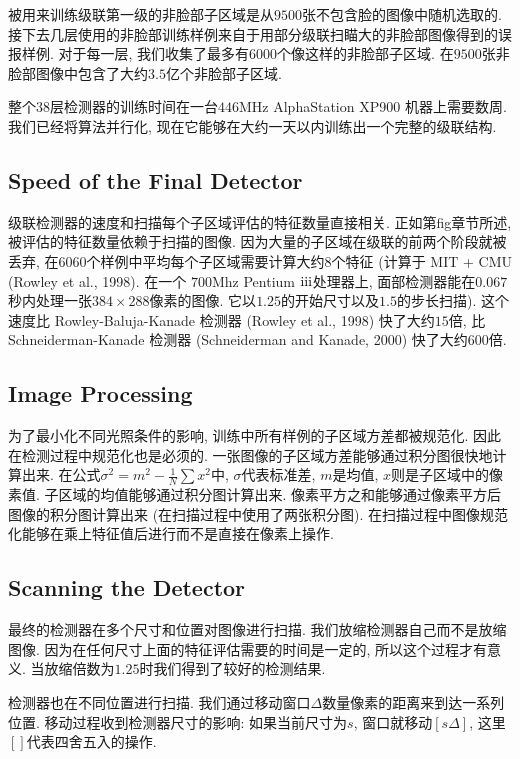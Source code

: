 \documentclass[utf8]{ctexart}
\newcommand{\RN}[1]{%
  \textup{\uppercase\expandafter{\romannumeral#1}}%
}
\begin{document}
被用来训练级联第一级的非脸部子区域是从$9500$张不包含脸的图像中随机选取的. 接下去几层使用的非脸部训练样例来自于用部分级联扫瞄大的非脸部图像得到的误报样例. 对于每一层, 我们收集了最多有$6000$个像这样的非脸部子区域. 在$9500$张非脸部图像中包含了大约$3.5$亿个非脸部子区域.

整个$38$层检测器的训练时间在一台$446$MHz AlphaStation XP900 机器上需要数周. 我们已经将算法并行化, 现在它能够在大约一天以内训练出一个完整的级联结构.

\subsection{Speed of the Final Detector}
级联检测器的速度和扫描每个子区域评估的特征数量直接相关. 正如第fig章节所述, 被评估的特征数量依赖于扫描的图像. 因为大量的子区域在级联的前两个阶段就被丢弃, 在$6060$个样例中平均每个子区域需要计算大约$8$个特征 (计算于 MIT + CMU (Rowley et al., 1998). 在一个 $700$Mhz Pentium $\RN{3}$处理器上, 面部检测器能在$0.067$秒内处理一张$384\times288$像素的图像. 它以$1.25$的开始尺寸以及$1.5$的步长扫描). 这个速度比 Rowley-Baluja-Kanade 检测器 (Rowley et al., 1998) 快了大约$15$倍, 比Schneiderman-Kanade 检测器 (Schneiderman and Kanade, 2000) 快了大约$600$倍.

\subsection{Image Processing}
为了最小化不同光照条件的影响, 训练中所有样例的子区域方差都被规范化. 因此在检测过程中规范化也是必须的. 一张图像的子区域方差能够通过积分图很快地计算出来. 在公式$\sigma^2=m^2-\frac1N\sum x^2$中, $\sigma$代表标准差, $m$是均值, $x$则是子区域中的像素值. 子区域的均值能够通过积分图计算出来. 像素平方之和能够通过像素平方后图像的积分图计算出来 (在扫描过程中使用了两张积分图).
在扫描过程中图像规范化能够在乘上特征值后进行而不是直接在像素上操作.

\subsection{Scanning the Detector}
最终的检测器在多个尺寸和位置对图像进行扫描. 我们放缩检测器自己而不是放缩图像. 因为在任何尺寸上面的特征评估需要的时间是一定的, 所以这个过程才有意义. 当放缩倍数为$1.25$时我们得到了较好的检测结果.

检测器也在不同位置进行扫描. 我们通过移动窗口$\Delta$数量像素的距离来到达一系列位置. 移动过程收到检测器尺寸的影响: 如果当前尺寸为$s$, 窗口就移动$[s\Delta]$, 这里$[]$代表四舍五入的操作.
\end{document}
